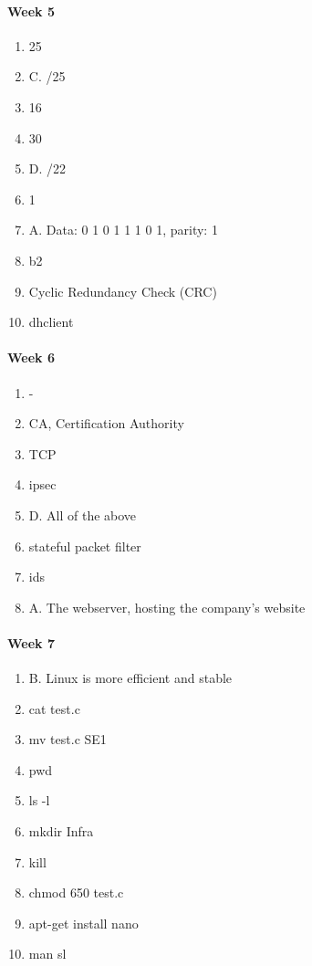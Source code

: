 \paragraph{Week 5}
\begin{enumerate}
    \item 25
    \item C. /25
    \item 16
    \item 30
    \item D. /22
    \item 1
    \item A. Data: 0 1 0 1 1 1 0 1, parity: 1
    \item b2
    \item Cyclic Redundancy Check (CRC)
    \item dhclient
\end{enumerate}
\paragraph{Week 6}
\begin{enumerate}
    \item -
    \item CA, Certification Authority
    \item TCP
    \item ipsec
    \item D. All of the above
    \item stateful packet filter
    \item ids
    \item A. The webserver, hosting the company's website
\end{enumerate}
\paragraph{Week 7}
\begin{enumerate}
    \item B. Linux is more efficient and stable
    \item cat test.c
    \item mv test.c SE1
    \item pwd
    \item ls -l
    \item mkdir Infra
    \item kill
    \item chmod 650 test.c
    \item apt-get install nano
    \item man sl
\end{enumerate}